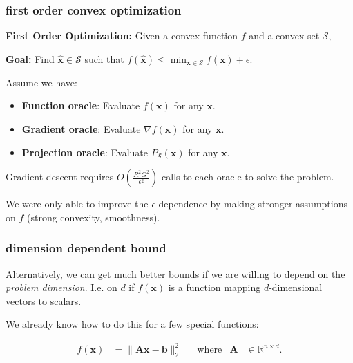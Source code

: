 \documentclass[compress]{beamer}
\newcommand{\bv}[1]{\mathbf{#1}}
\newcommand{\R}{\mathbb{R}}
\begin{document}
	

\begin{frame}[t]
	\frametitle{first order convex optimization}
	\textbf{First Order Optimization:} Given a convex function $f$ and a convex set $\mathcal{S}$, 
	\begin{center}
		\textbf{Goal:} Find $\hat{\bv{x}}\in \mathcal{S}$ such that $f(\hat{\bv{x}}) \leq \min_{\bv{x}\in \mathcal{S}}f(\bv{x})+\epsilon$.
	\end{center}
	Assume we have:
	\begin{itemize}
		\item \textbf{Function oracle}: Evaluate $f(\bv{x})$ for any $\bv{x}$. 
		\item \textbf{Gradient oracle}: Evaluate $\nabla f(\bv{x})$ for any $\bv{x}$.
		\item \textbf{{Projection oracle}}: Evaluate $P_{\mathcal{S}}(\bv{x})$ for any $\bv{x}$.
	\end{itemize}
Gradient descent requires $O\left(\frac{R^2G^2}{\epsilon^2}\right)$ calls to each oracle  to solve the problem. 

We were only able to improve the $\epsilon$ dependence by making stronger assumptions on $f$ (strong convexity, smoothness). 
\end{frame}

\begin{frame}[t]
	\frametitle{dimension dependent bound}
	Alternatively, we can get much better bounds if we are willing to depend on the \emph{problem dimension}. I.e. on $d$ if $f(\bv{x})$ is a function mapping $d$-dimensional vectors to scalars.   
	
	We already know how to do this for a few special functions:
	
	\begin{align*}
		f(\bv{x}) &= \|\bv{A}\bv{x} - \bv{b}\|_2^2 & &\text{where} & \bv{A}&\in \R^{n\times d}.
	\end{align*}
	
\end{frame}
\end{document}
